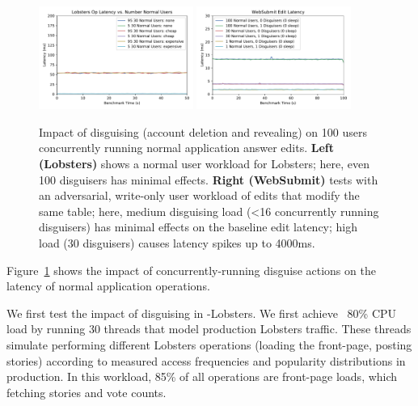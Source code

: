 
\begin{figure}[t!]
    \centering
        \includegraphics[width=0.45\textwidth]{figs/lobsters_concurrent_results_timeseries}
        \includegraphics[width=0.45\textwidth]{figs/websubmit_concurrent_results_timeseries}
    \caption{Impact of disguising (account deletion and revealing) on 100 users concurrently running
    normal application answer edits.
    \textbf{Left (Lobsters)} shows a normal user workload for Lobsters; here, even 100 disguisers
    has minimal effects.
    \textbf{Right (WebSubmit)} tests with an adversarial,
    write-only user workload of edits that modify the same table; here, medium disguising load (<16
    concurrently running disguisers) has minimal effects on the baseline edit latency; high load (30
    disguisers) causes latency spikes up to 4000ms.
    }
    \label{fig:concurrent}
\end{figure}

Figure~\ref{fig:concurrent} shows the impact of concurrently-running disguise actions on the latency
of normal application operations.

We first test the impact of disguising in \sys-Lobsters. We first achieve ~80\% CPU load by running
30 threads that model production Lobsters traffic. These threads simulate performing different
Lobsters operations (\eg loading the front-page, posting stories) according to measured access
frequencies and popularity distributions in production. In this workload, 85\% of all
operations are front-page loads, which fetching stories and vote counts.

